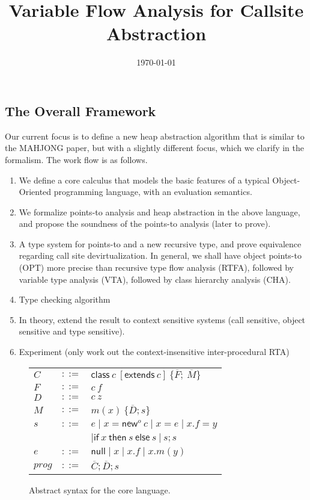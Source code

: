 \documentclass{llncs}
\title{Variable Flow Analysis for Callsite Abstraction}
\author{\today}
\institute{Jinan University}
\newcommand{\keyword}[1]{\mathsf{#1}}
\newcommand{\kwnull}[0]{\keyword{null}}
\newcommand{\kwnew}[0]{\keyword{new}}
\newcommand{\kwextends}[0]{\keyword{extends}}
\newcommand{\kwclass}[0]{\keyword{class}}
\newcommand{\kwif}[0]{\keyword{if}}
\newcommand{\kwthen}[0]{\keyword{then}}
\newcommand{\kwelse}[0]{\keyword{else}}
\begin{document}
\maketitle


\subsection*{The Overall Framework}

Our current focus is to define a new heap abstraction algorithm that is similar to the MAHJONG paper, but with a slightly different focus, which we clarify in the formalism.
The work flow is as follows.
\begin{enumerate}
  \item We define a core calculus that models the basic features of a typical Object-Oriented programming language, with an evaluation semantics.
  \item We formalize points-to analysis and heap abstraction in the above language, and propose the soundness of the points-to analysis (later to prove).
  \item A type system for points-to and a new recursive type, and prove equivalence regarding call site devirtualization. In general, we shall have object points-to (OPT)
        more precise than recursive type flow analysis (RTFA), followed by variable type analysis (VTA), followed by class hierarchy analysis (CHA).
  \item Type checking algorithm
  \item In theory, extend the result to context sensitive systems (call sensitive, object sensitive and type sensitive).
  \item Experiment (only work out the context-insensitive inter-procedural RTA)
\end{enumerate}

\begin{figure}[!htbp]\centering
	\begin{tabular}[c]{lll} %
		$C$&$::=$&$\kwclass\ c\ [\kwextends\ c] \ \{\overline{F};\ \overline{M}\}$\\
        $F$&$::=$&$c \ f$\\
        $D$&$::=$&$c \ z$\\
		$M$&$::=$&$m(x) \ \{\overline{D}; s\}$\\
		$s$&$::=$&$e\mid x{=}\kwnew^{o} \ c\mid  x {=} e \mid x.f{=}y $\\
		&&$ \mid \kwif \ x \ \kwthen \ s \ \kwelse \ s \ |\ s;s$\\
		$e$&$::=$&$ \kwnull\mid x \mid x.f \mid x.m(y) $\\
        $prog$&$::=$&$\overline{C};\overline{D}; s$\\
	\end{tabular}
	\caption{Abstract syntax for the core language. \label{fig:syntax}}
\end{figure}
\end{document}
